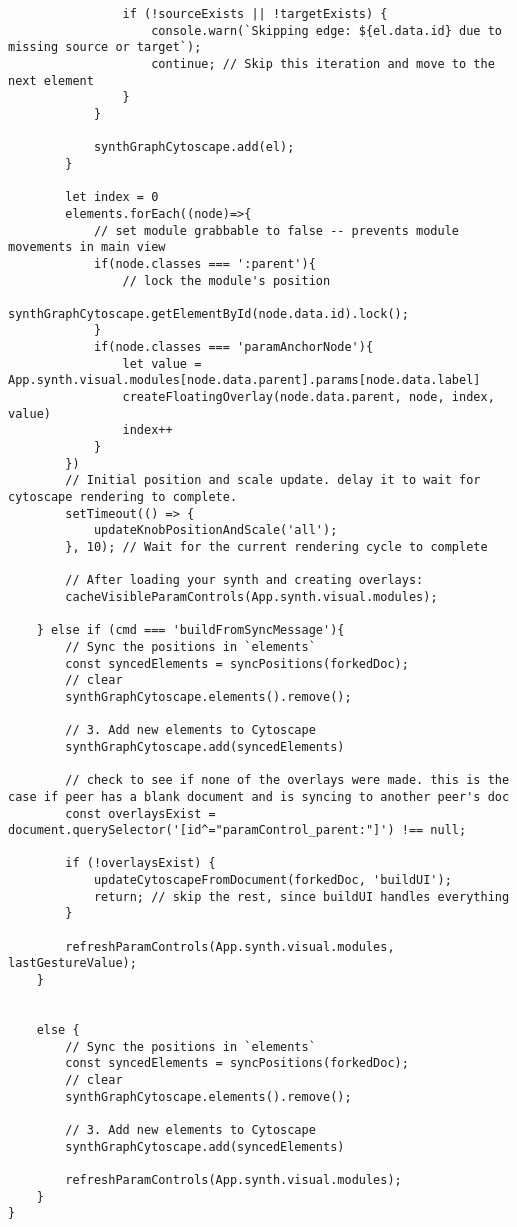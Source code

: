 \begin{lstlisting}
                if (!sourceExists || !targetExists) {
                    console.warn(`Skipping edge: ${el.data.id} due to missing source or target`);
                    continue; // Skip this iteration and move to the next element
                }
            }

            synthGraphCytoscape.add(el);
        }
        
        let index = 0
        elements.forEach((node)=>{
            // set module grabbable to false -- prevents module movements in main view
            if(node.classes === ':parent'){
                // lock the module's position
                synthGraphCytoscape.getElementById(node.data.id).lock();
            }
            if(node.classes === 'paramAnchorNode'){
                let value = App.synth.visual.modules[node.data.parent].params[node.data.label]
                createFloatingOverlay(node.data.parent, node, index, value)
                index++
            }
        })
        // Initial position and scale update. delay it to wait for cytoscape rendering to complete. 
        setTimeout(() => {
            updateKnobPositionAndScale('all');
        }, 10); // Wait for the current rendering cycle to complete
        
        // After loading your synth and creating overlays:
        cacheVisibleParamControls(App.synth.visual.modules);
        
    } else if (cmd === 'buildFromSyncMessage'){
        // Sync the positions in `elements`
        const syncedElements = syncPositions(forkedDoc);
        // clear 
        synthGraphCytoscape.elements().remove();

        // 3. Add new elements to Cytoscape
        synthGraphCytoscape.add(syncedElements)

        // check to see if none of the overlays were made. this is the case if peer has a blank document and is syncing to another peer's doc
        const overlaysExist = document.querySelector('[id^="paramControl_parent:"]') !== null;

        if (!overlaysExist) {
            updateCytoscapeFromDocument(forkedDoc, 'buildUI');
            return; // skip the rest, since buildUI handles everything
        }

        refreshParamControls(App.synth.visual.modules, lastGestureValue);
    }
    
    
    else {
        // Sync the positions in `elements`
        const syncedElements = syncPositions(forkedDoc);
        // clear 
        synthGraphCytoscape.elements().remove();

        // 3. Add new elements to Cytoscape
        synthGraphCytoscape.add(syncedElements)

        refreshParamControls(App.synth.visual.modules);
    }
}   

\end{lstlisting}





